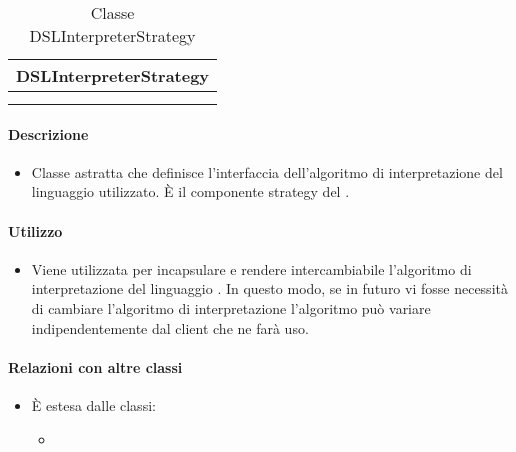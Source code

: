 \begin{table}[H]
\begin{center}
\bgroup
\setlength{\arrayrulewidth}{0.6mm}
\def\arraystretch{1}
\begin{tabular}{ | p{12cm} | }
\hline
\centerline{\textbf{DSLInterpreterStrategy}}
\\ \hline
 \\ 
\hline
 \\ 
\hline
\end{tabular}
\egroup
\caption{Classe DSLInterpreterStrategy}
\end{center}
\end{table}

\paragraph*{Descrizione}
\begin{itemize}
\item[] Classe astratta che definisce l'interfaccia dell'algoritmo di interpretazione del linguaggio  utilizzato. È il componente strategy del  .
\end{itemize}

\paragraph*{Utilizzo}
\begin{itemize}
\item[] Viene utilizzata per incapsulare e rendere intercambiabile l'algoritmo di interpretazione del linguaggio . In questo modo, se in futuro vi fosse necessità di cambiare l'algoritmo di interpretazione l'algoritmo può variare indipendentemente dal client che ne farà uso.
\end{itemize}

\paragraph*{Relazioni con altre classi}
\begin{itemize}

\item[] È estesa dalle classi:
\begin{itemize}
\item {}
\end{itemize}

\end{itemize}

